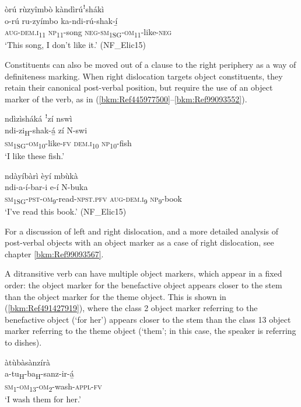 \ea
\label{bkm:Ref452554600}
òrú rùzyîmbò kàndìrúꜝshákì\\
\gll o-rú    ru-zyímbo  ka-ndi-rú-shak-í̲\\
\textsc{aug}-\textsc{dem}.\textsc{i}\textsubscript{11}  \textsc{np}\textsubscript{11}-song  \textsc{neg}-\textsc{sm}\textsubscript{1SG}-\textsc{om}\textsubscript{11}-like-\textsc{neg}\\
\glt ‘This song, I don’t like it.’ (NF\_Elic15)
\z

Constituents can also be moved out of a clause to the right periphery as a way of definiteness marking. When right dislocation targets object constituents, they retain their canonical post-verbal position, but require the use of an object marker of the verb, as in (\ref{bkm:Ref445977500}--\ref{bkm:Ref99093552}).

\ea
\label{bkm:Ref445977500}
ndìzìsháká ꜝzí nswì\\
\gll ndi-zi\textsubscript{H}-shak-á̲  zí    N-swi\\
\textsc{sm}\textsubscript{1SG}-\textsc{om}\textsubscript{10}-like-\textsc{fv}  \textsc{dem}.\textsc{i}\textsubscript{10}  \textsc{np}\textsubscript{10}-fish\\
\glt ‘I like these fish.’
\z

\ea
\label{bkm:Ref99093552}
ndàyíbàrì èyí mbùkà\\
\gll ndi-a-í-bar-i        e-í    N-buka\\
\textsc{sm}\textsubscript{1SG}-\textsc{pst}-\textsc{om}\textsubscript{9}-read-\textsc{npst}.\textsc{pfv}  \textsc{aug}-\textsc{dem}.\textsc{i}\textsubscript{9}  \textsc{np}\textsubscript{9}-book\\
\glt ‘I’ve read this book.’ (NF\_Elic15)
\z

For a discussion of left and right dislocation, and a more detailed analysis of post-verbal objects with an object marker as a case of right dislocation, see chapter \ref{bkm:Ref99093567}.

A ditransitive verb can have multiple object markers, which appear in a fixed order: the object marker for the benefactive object appears closer to the stem than the object marker for the theme object. This is shown in (\ref{bkm:Ref491427919}), where the class 2 object marker referring to the benefactive object (‘for her’) appears closer to the stem than the class 13 object marker referring to the theme object (‘them’; in this case, the speaker is referring to dishes).

\ea
\label{bkm:Ref491427919}
\ea
\glll àtùbàsànzírà\\
a-tu\textsubscript{H}-ba\textsubscript{H}-sanz-ir-á̲\\
\textsc{sm}\textsubscript{1}-\textsc{om}\textsubscript{13}-\textsc{om}\textsubscript{2}-wash-\textsc{appl}-\textsc{fv}\\
\glt ‘I wash them for her.’

